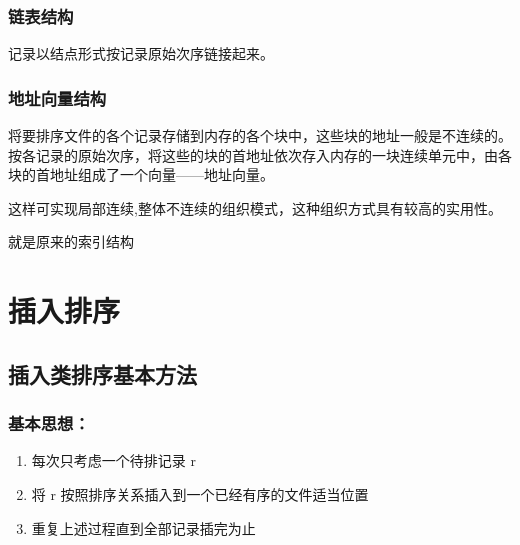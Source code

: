 \documentclass[AutoFakeBold]{LZUThesis2007}
\begin{document}
			\subsubsection{链表结构}
记录以结点形式按记录原始次序链接起来。

			\subsubsection{地址向量结构}
将要排序文件的各个记录存储到内存的各个块中，这些块的地址一般是不连续的。按各记录的原始次序，将这些的块的首地址依次存入内存的一块连续单元中，由各块的首地址组成了一个向量——地址向量。

这样可实现局部连续,整体不连续的组织模式，这种组织方式具有较高的实用性。

就是原来的索引结构
	\section{插入排序}
		\subsection{插入类排序基本方法}
			\subsubsection{基本思想：}

\begin{enumerate}
	\item 每次只考虑一个待排记录 r
	\item 将 r 按照排序关系插入到一个已经有序的文件适当位置
	\item 重复上述过程直到全部记录插完为止
\end{enumerate}
\end{document}

